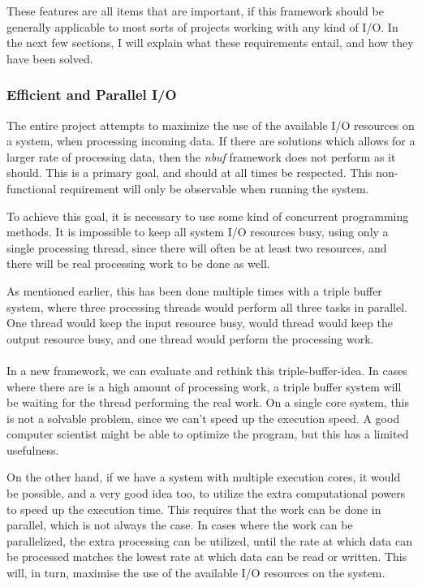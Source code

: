 \documentclass[a4paper]{article}
\newcommand{\nbuf}{\textit{nbuf} }
\begin{document}
These features are all items that are important, if this framework should be generally applicable to most sorts of projects working with any kind of I/O. In the next few sections, I will explain what these requirements entail, and how they have been solved.

\subsubsection{Efficient and Parallel I/O}
The entire project attempts to maximize the use of the available I/O resources on a system, when processing incoming data. If there are solutions which allows for a larger rate of processing data, then the \nbuf framework does not perform as it should. This is a primary goal, and should at all times be respected. This non-functional requirement will only be observable when running the system.

To achieve this goal, it is necessary to use some kind of concurrent programming methods. It is impossible to keep all system I/O resources busy, using only a single processing thread, since there will often be at least two resources, and there will be real processing work to be done as well. 

As mentioned earlier, this has been done multiple times with a triple buffer system, where three processing threads would perform all three tasks in parallel. One thread would keep the input resource busy, would thread would keep the output resource busy, and one thread would perform the processing work.\\\\
 

In a new framework, we can evaluate and rethink this triple-buffer-idea. In cases where there are is a high amount of processing work, a triple buffer system will be waiting for the thread performing the real work. On a single core system, this is not a solvable problem, since we can't speed up the execution speed. A good computer scientist might be able to optimize the program, but this has a limited usefulness. 

On the other hand, if we have a system with multiple execution cores, it would be possible, and a very good idea too, to utilize the extra computational powers to speed up the execution time. This requires that the work can be done in parallel, which is not always the case. In cases where the work can be parallelized, the extra processing can be utilized, until the rate at which data can be processed matches the lowest rate at which data can be read or written. This will, in turn, maximise the use of the available I/O resources on the system.
\end{document}
